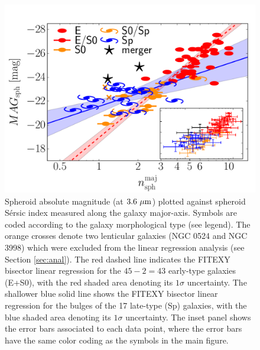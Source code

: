 \documentclass[preprint2]{emulateapj}
\begin{document}
\begin{figure}[h]
\begin{center}
\includegraphics[width=\columnwidth]{mag_vs_n_maj.pdf}
\caption{Spheroid absolute magnitude (at $3.6\rm~\mu m$) plotted against spheroid S\'ersic index 
measured along the galaxy major-axis. 
Symbols are coded according to the galaxy morphological type (see legend).
The orange crosses denote two lenticular galaxies (NGC 0524 and NGC 3998) which were excluded from the linear regression analysis 
(see Section \ref{sec:anal}). 
The red dashed line indicates the FITEXY bisector linear regression for the $45-2=43$  early-type galaxies (E+S0), 
with the red shaded area denoting its $1\sigma$ uncertainty. 
The shallower blue solid line shows the FITEXY bisector linear regression for the bulges of the 17 late-type (Sp) galaxies, 
with the blue shaded area denoting its $1\sigma$ uncertainty. 
The inset panel shows the error bars associated to each data point,  
where the error bars have the same color coding as the symbols in the main figure. 
}
\label{fig:magn}
\end{center}
\end{figure}
\end{document}
